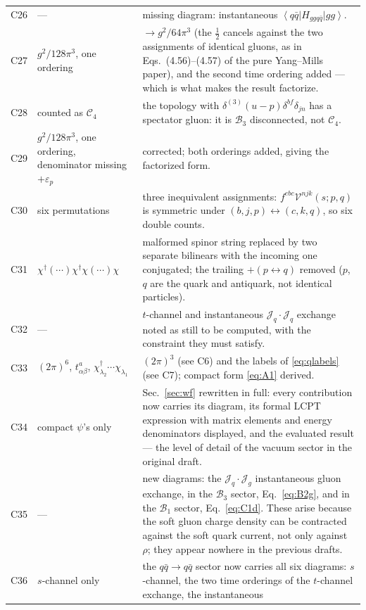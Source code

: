 \documentclass[11pt]{article}
\newcommand{\eps}{\varepsilon}
\newcommand{\dg}{\dagger}
\newcommand{\dthree}{\delta^{(3)}}
\newcommand{\ket}[1]{\left|#1\right\rangle}
\newcommand{\bra}[1]{\left\langle#1\right|}
\newcommand{\Vg}{\mathcal{V}}
\newcommand{\Jc}{\mathcal{J}}
\newcommand{\B}{\mathcal{B}}
\newcommand{\C}{\mathcal{C}}
\begin{document}
\begin{center}
\begin{longtable}{c>{\raggedright\arraybackslash}p{3.9cm}p{7.6cm}}
C26 & --- & missing diagram: instantaneous $\bra{q\bar q}H_{ggq\bar q}\ket{gg}$.\\
C27 & $g^{2}/128\pi^{3}$, one ordering & $\to g^{2}/64\pi^{3}$ (the $\tfrac12$ cancels against the
two assignments of identical gluons, as in Eqs.~(4.56)--(4.57) of the pure Yang--Mills paper), and
the second time ordering added --- which is what makes the result factorize.\\
C28 & counted as $\C_{4}$ & the topology with $\dthree(u-p)\delta^{bf}\delta_{jn}$ has a spectator
gluon: it is $\B_{3}$ disconnected, not $\C_{4}$.\\
C29 & $g^{2}/128\pi^{3}$, one ordering, denominator missing $+\eps_{p}$ & corrected; both
orderings added, giving the factorized form.\\
C30 & six permutations & three inequivalent assignments: $f^{ebc}\Vg^{njk}(s;p,q)$ is symmetric
under $(b,j,p)\leftrightarrow(c,k,q)$, so six double counts.\\
C31 & $\chi^{\dg}(\cdots)\chi^{\dg}\chi(\cdots)\chi$ & malformed spinor string replaced by two
separate bilinears with the incoming one conjugated; the trailing $+(p\leftrightarrow q)$ removed
($p$, $q$ are the quark and antiquark, not identical particles).\\
C32 & --- & $t$-channel and instantaneous $\mathcal J_{q}\!\cdot\!\mathcal J_{q}$ exchange noted
as still to be computed, with the constraint they must satisfy.\\
C33 & $(2\pi)^{6}$, $t^{a}_{\alpha\beta}$, $\chi^{\dg}_{\lambda_{2}}\!\cdots\chi_{\lambda_{1}}$ &
$(2\pi)^{3}$ (see C6) and the labels of \eqref{eq:qlabels} (see C7); compact form
\eqref{eq:A1} derived.\\
C34 & compact $\psi$'s only & Sec.~\ref{sec:wf} rewritten in full: every contribution now carries
its diagram, its formal LCPT expression with matrix elements and energy denominators displayed,
and the evaluated result --- the level of detail of the vacuum sector in the original draft.\\
C35 & --- & new diagrams: the $\Jc_{q}\!\cdot\!\Jc_{g}$ instantaneous gluon exchange, in the
$\B_{3}$ sector, Eq.~\eqref{eq:B2g}, and in the $\B_{1}$ sector, Eq.~\eqref{eq:C1d}. These arise
because the soft gluon charge density can be contracted against the soft quark current, not only
against $\rho$; they appear nowhere in the previous drafts.\\
C36 & $s$-channel only & the $q\bar q\to q\bar q$ sector now carries all six diagrams:
$s$-channel, the two time orderings of the $t$-channel exchange, the instantaneous

\end{longtable}
\end{center}
\end{document}

